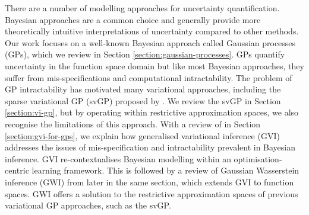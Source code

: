 \documentclass{article}
\numberwithin{equation}{section}
\begin{document}

There are a number of modelling approaches for uncertainty quantification. 
Bayesian approaches are a common choice and generally provide more theoretically intuitive interpretations of uncertainty compared to other methods. 
Our work focuses on a well-known Bayesian approach called Gaussian processes (GPs), which we review in Section \ref{section:gaussian-processes}.
GPs quantify uncertainty in the function space domain but like most Bayesian approaches, they suffer from mis-specifications and computational intractability. 
The problem of GP intractability has motivated many variational approaches, including the sparse variational GP (svGP) proposed by \cite{titsias2009variational}.
We review the svGP in Section \ref{section:vi-gp}, but by operating within restrictive approximation spaces, we also recognise the limitations of this approach. 
With a review of \cite{knoblauch2022optimization} in Section \ref{section:gvi-for-gps}, we explain how generalised variational inference (GVI) addresses the issues of mis-specification and intractability prevalent in Bayesian inference.
GVI re-contextualises Bayesian modelling within an optimisation-centric learning framework.
This is followed by a review of Gaussian Wasserstein inference (GWI) from \cite{wild2022generalized} later in the same section, which extends GVI to function spaces.
GWI offers a solution to the restrictive approximation spaces of previous variational GP approaches, such as the svGP.
\end{document}
